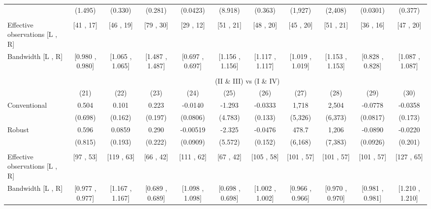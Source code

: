 \begin{tabular}{lcccccccccc}
      & (1.495) & (0.330) & (0.281) & (0.0423) & (8.918) & (0.363) & (1,927) & (2,408) & (0.0301) & (0.377) \\
      &       &       &       &       &       &       &       &       &       &  \\
\midrule
Effective observations [L , R] & [41 , 17] & [46 , 19] & [79 , 30] & [29 , 12] & [51 , 21] & [48 , 20] & [45 , 20] & [51 , 21] & [36 , 16] & [47 , 20] \\
Bandwidth [L , R] & [0.980 , 0.980] & [1.065 , 1.065] & [1.487 , 1.487] & [0.697 , 0.697] & [1.156 , 1.156] & [1.117 , 1.117] & [1.019 , 1.019] & [1.153 , 1.153] & [0.828 , 0.828] & [1.087 , 1.087] \\
\midrule
\midrule
      &       &       &       &       &       &       &       &       &       &  \\
\midrule
      & \multicolumn{10}{c}{(II \& III) vs (I \& IV)} \\
\midrule
\midrule
      & (21)  & (22)  & (23)  & (24)  & (25)  & (26)  & (27)  & (28)  & (29)  & (30) \\
\midrule
\midrule
Conventional & 0.504 & 0.101 & 0.223 & -0.0140 & -1.293 & -0.0333 & 1,718 & 2,504 & -0.0778 & -0.0358 \\
      & (0.698) & (0.162) & (0.197) & (0.0806) & (4.783) & (0.133) & (5,326) & (6,373) & (0.0817) & (0.173) \\
Robust & 0.596 & 0.0859 & 0.290 & -0.00519 & -2.325 & -0.0476 & 478.7 & 1,206 & -0.0890 & -0.0220 \\
      & (0.815) & (0.193) & (0.222) & (0.0909) & (5.572) & (0.152) & (6,168) & (7,383) & (0.0926) & (0.201) \\
      &       &       &       &       &       &       &       &       &       &  \\
\midrule
Effective observations [L , R] & [97 , 53] & [119 , 63] & [66 , 42] & [111 , 62] & [67 , 42] & [105 , 58] & [101 , 57] & [101 , 57] & [101 , 57] & [127 , 65] \\
Bandwidth [L , R] & [0.977 , 0.977] & [1.167 , 1.167] & [0.689 , 0.689] & [1.098 , 1.098] & [0.698 , 0.698] & [1.002 , 1.002] & [0.966 , 0.966] & [0.970 , 0.970] & [0.981 , 0.981] & [1.210 , 1.210] \\
\bottomrule
\bottomrule
\end{tabular}%
